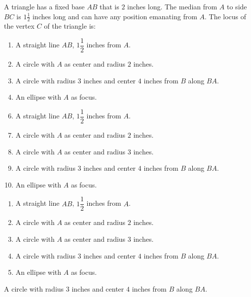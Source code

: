 A triangle has a fixed base $AB$ that is $2$ inches long. The median from $A$ to side $BC$ is $1\frac{1}{2}$ inches long and can have any position emanating from $A$. The locus of the vertex $C$ of the triangle is:


\ifsat
	\begin{enumerate}[label=\Alph*)]
		\item A straight line $AB$, $1\dfrac{1}{2}$ inches from $A$. 
		\item A circle with $A$ as center and radius $2$ inches.
		\item A circle with radius $3$ inches and center $4$ inches from $B$ along $BA$.%
		\item An ellipse with $A$ as focus.
	\end{enumerate}
\else
\fi

\ifacteven
	\begin{enumerate}[label=\textbf{\Alph*.},itemsep=\fill,align=left]
		\setcounter{enumii}{5}
		\item A straight line $AB$, $1\dfrac{1}{2}$ inches from $A$. 
		\item A circle with $A$ as center and radius $2$ inches.
		\item A circle with $A$ as center and radius $3$ inches. 
		\addtocounter{enumii}{1}
		\item A circle with radius $3$ inches and center $4$ inches from $B$ along $BA$.%
		\item An ellipse with $A$ as focus.
	\end{enumerate}
\else
\fi

\ifactodd
	\begin{enumerate}[label=\textbf{\Alph*.},itemsep=\fill,align=left]
		\item A straight line $AB$, $1\dfrac{1}{2}$ inches from $A$. 
		\item A circle with $A$ as center and radius $2$ inches.
		\item A circle with $A$ as center and radius $3$ inches. 
		\item A circle with radius $3$ inches and center $4$ inches from $B$ along $BA$.%
		\item An ellipse with $A$ as focus.
	\end{enumerate}
\else
\fi

\ifgridin
 A circle with radius $3$ inches and center $4$ inches from $B$ along $BA$.%
		
\else
\fi

